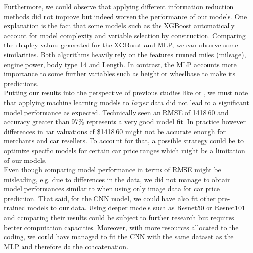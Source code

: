 \documentclass[12pt]{article}
\begin{document}
\noindent Furthermore, we could observe that applying different information reduction methods did not improve but indeed worsen the performance of our models. One explanation is the fact that some models such as the XGBoost automatically account for model complexity and variable selection by construction. Comparing the shapley values generated for the XGBoost and MLP, we can observe some similarities. Both algorithms heavily rely on the features runned miles (mileage), engine power, body type 14 and Length. In contrast, the MLP accounts more importance to some further variables such as height or wheelbase to make its predictions. \\

\noindent Putting our results into the perspective of previous studies like \cite{Gajera2021} or \cite{Karakoç2020}, we must note that applying machine learning models to \textit{larger} data did not lead to a significant model performance as expected. Technically seen an RMSE of 1418.60 and accuracy greater than 97\% represents a very good model fit. In practice however differences in car valuations of \$1418.60 might not be accurate enough for merchants and car resellers. To account for that, a possible strategy could be to optimize specific models for certain car price ranges which might be a limitation of our models.\\

\noindent Even though comparing model performance in terms of RMSE might be misleading, e.g. due to differences in the data, we did not manage to obtain model performances similar to \cite{yang2018ai} when using only image data for car price prediction. That said, for the CNN model, we could have also fit other pre-trained models to our data. Using deeper models such as Resnet50 or Resnet101 and comparing their results could be subject to further research but requires better computation capacities. Moreover, with more resources allocated to the coding, we could have managed to fit the CNN with the same dataset as the MLP and therefore do the concatenation.

 \newpage
 \printbibliography
 
\end{document}
